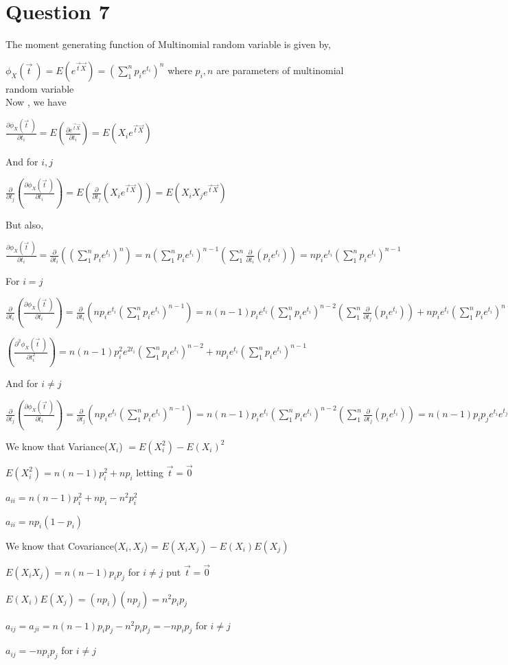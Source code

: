 \documentclass{article}
\begin{document}
\section*{Question 7}
    The moment generating function of Multinomial random variable is given by,\par
    $\phi_X(\vec t \ ) = E(e^{\vec t \Vec{X}}) = {(\sum_1^n p_i e^{t_i})}^n$ where $p_i, n$ are parameters of multinomial random variable\\
    Now , we have \par 
    $\frac{\partial \phi_X(\vec t \ )}{\partial t_i} = E (\frac{\partial e^{\vec t \Vec{X}} }{\partial t_i})  = E(X_i e^{\vec t \Vec{X}})$\par 
    And for $i,j$\par 
    $\frac{\partial }{\partial t_j}({\frac{\partial \phi_X(\vec t \ )}{\partial t_i}}) = E(\frac{\partial }{\partial t_j}(X_i e^{\vec t \Vec{X}})) = E(X_iX_je^{\vec t \Vec{X}})$\par 
    But also,\par 
    $\frac{\partial \phi_X(\vec t \ )}{\partial t_i} = \frac{\partial }{\partial t_i}({(\sum_1^n p_i e^{t_i})}^n) = n {(\sum_1^n p_i e^{t_i})}^{n-1} {(\sum_1^n \frac{\partial }{\partial t_i}(p_i e^{t_i}))} = np_ie^{t_i} {(\sum_1^n p_i e^{t_i})}^{n-1} $\par 
    For $i = j$\par 
    $\frac{\partial }{\partial t_i}({\frac{\partial \phi_X(\vec t \ )}{\partial t_i}}) = \frac{\partial }{\partial t_i}(np_ie^{t_i} {(\sum_1^n p_i e^{t_i})}^{n-1}) = n(n-1)p_ie^{t_i} {(\sum_1^n p_i e^{t_i})}^{n-2}{(\sum_1^n \frac{\partial }{\partial t_j}(p_i e^{t_i}))} + np_ie^{t_i} {(\sum_1^n p_i e^{t_i})}^{n-1} $\par  
    $({\frac{\partial^2 \phi_X(\vec t \ )}{\partial t_i^2}})= n(n-1)p_i^2e^{2t_i} {(\sum_1^n p_i e^{t_i})}^{n-2} + np_ie^{t_i} {(\sum_1^n p_i e^{t_i})}^{n-1} $\par
    And for $i \neq j$\par
    $\frac{\partial }{\partial t_j}({\frac{\partial \phi_X(\vec t \ )}{\partial t_i}}) = \frac{\partial }{\partial t_j}(np_ie^{t_i} {(\sum_1^n p_i e^{t_i})}^{n-1}) = n(n-1)p_ie^{t_i} {(\sum_1^n p_i e^{t_i})}^{n-2}{(\sum_1^n \frac{\partial }{\partial t_j}(p_i e^{t_i}))} = n(n-1)p_ip_je^{t_i}e^{t_j} {(\sum_1^n p_i e^{t_i})}^{n-2}$\par 
    We know that Variance($X_i$) $= E(X_i^2) - E(X_i)^2$\par 
    $E(X_i^2) = n(n-1)p_i^2 +np_i$ letting $\vec t = \vec 0$\par 
    $a_{ii} = n(n-1)p_i^2 +np_i - n^2p_i^2$\par 
    $a_{ii} = np_i(1-p_i)$\par 
    We know that Covariance($X_i,X_j$) = $E(X_iX_j) - E(X_i)E(X_j)$\par 
    $E(X_iX_j) = n(n-1)p_ip_j $ for $i \neq j$ put $\vec t  = \vec  0$ \par 
    $E(X_i)E(X_j) = (n p_i)( n p_j) = n^2 p_ip_j$\par 
    $a_{ij} = a_{ji} = n(n-1)p_ip_j - n^2 p_ip_j = -np_ip_j$ for $i \neq j$\par 
    $a_{ij} = -np_ip_j $ for $i \neq j$ \par 
\end{document}
